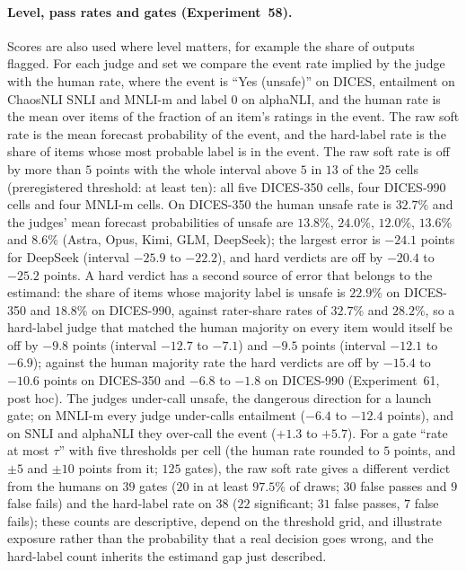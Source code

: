 \paragraph{Level, pass rates and gates (Experiment~58).}
Scores are also used where level matters, for example the share of outputs flagged.
For each judge and set we compare the event rate implied by the judge with the human rate, where the event is ``Yes (unsafe)'' on DICES, entailment on ChaosNLI SNLI and MNLI-m and label $0$ on alphaNLI, and the human rate is the mean over items of the fraction of an item's ratings in the event.
The raw soft rate is the mean forecast probability of the event, and the hard-label rate is the share of items whose most probable label is in the event.
The raw soft rate is off by more than $5$ points with the whole interval above $5$ in $13$ of the $25$ cells (preregistered threshold: at least ten): all five DICES-350 cells, four DICES-990 cells and four MNLI-m cells.
On DICES-350 the human unsafe rate is $32.7\%$ and the judges' mean forecast probabilities of unsafe are $13.8\%$, $24.0\%$, $12.0\%$, $13.6\%$ and $8.6\%$ (Astra, Opus, Kimi, GLM, DeepSeek); the largest error is $-24.1$ points for DeepSeek (interval $-25.9$ to $-22.2$), and hard verdicts are off by $-20.4$ to $-25.2$ points.
A hard verdict has a second source of error that belongs to the estimand: the share of items whose majority label is unsafe is $22.9\%$ on DICES-350 and $18.8\%$ on DICES-990, against rater-share rates of $32.7\%$ and $28.2\%$, so a hard-label judge that matched the human majority on every item would itself be off by $-9.8$ points (interval $-12.7$ to $-7.1$) and $-9.5$ points (interval $-12.1$ to $-6.9$); against the human majority rate the hard verdicts are off by $-15.4$ to $-10.6$ points on DICES-350 and $-6.8$ to $-1.8$ on DICES-990 (Experiment~61, post hoc).
The judges under-call unsafe, the dangerous direction for a launch gate; on MNLI-m every judge under-calls entailment ($-6.4$ to $-12.4$ points), and on SNLI and alphaNLI they over-call the event ($+1.3$ to $+5.7$).
For a gate ``rate at most $\tau$'' with five thresholds per cell (the human rate rounded to $5$ points, and $\pm5$ and $\pm10$ points from it; $125$ gates), the raw soft rate gives a different verdict from the humans on $39$ gates ($20$ in at least $97.5\%$ of draws; $30$ false passes and $9$ false fails) and the hard-label rate on $38$ ($22$ significant; $31$ false passes, $7$ false fails); these counts are descriptive, depend on the threshold grid, and illustrate exposure rather than the probability that a real decision goes wrong, and the hard-label count inherits the estimand gap just described.

